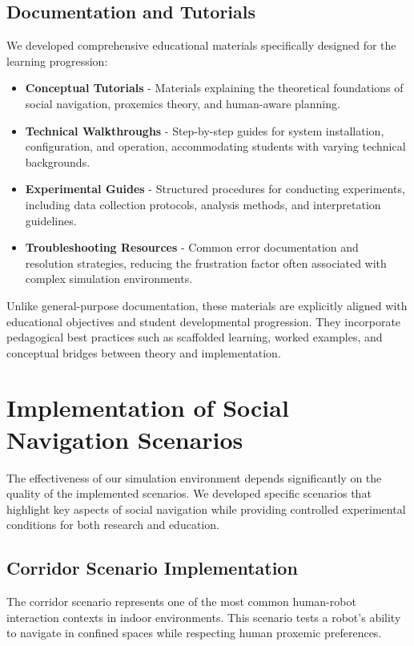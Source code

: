 \subsection{Documentation and Tutorials}
We developed comprehensive educational materials specifically designed for the learning 
progression:
\begin{itemize}
    \item \textbf{Conceptual Tutorials} - Materials explaining the theoretical foundations of 
    social navigation, proxemics theory, and human-aware planning.
    \item \textbf{Technical Walkthroughs} - Step-by-step guides for system installation, configuration, 
    and operation, accommodating students with varying technical backgrounds.
    \item \textbf{Experimental Guides} - Structured procedures for conducting experiments, including 
    data collection protocols, analysis methods, and interpretation guidelines.
    \item \textbf{Troubleshooting Resources} - Common error documentation and resolution strategies, 
    reducing the frustration factor often associated with complex simulation environments.
\end{itemize}
Unlike general-purpose documentation, these materials are explicitly aligned with educational 
objectives and student developmental progression. They incorporate pedagogical best practices 
such as scaffolded learning, worked examples, and conceptual bridges between theory and 
implementation.

\section{Implementation of Social Navigation Scenarios}
The effectiveness of our simulation environment depends significantly on the quality of the 
implemented scenarios. We developed specific scenarios that highlight key aspects of social 
navigation while providing controlled experimental conditions for both research and education.

\subsection{Corridor Scenario Implementation}
The corridor scenario represents one of the most common human-robot interaction contexts 
in indoor environments. This scenario tests a robot's ability to navigate in confined spaces 
while respecting human proxemic preferences.

